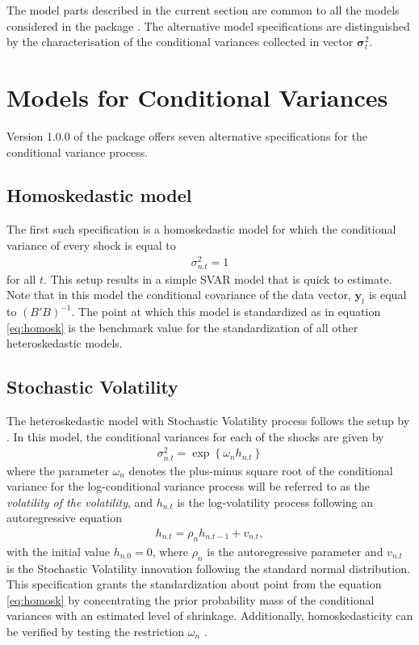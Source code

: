 \documentclass[
  nojss]{jss}
\begin{document}
The model parts described in the current section are common to all the
models considered in the package . The alternative model
specifications are distinguished by the characterisation of the
conditional variances collected in vector \(\boldsymbol{\sigma}_t^2\).

\section{Models for Conditional Variances}\label{sec:variances}

Version 1.0.0 of the  package offers seven alternative
specifications for the conditional variance process.

\subsection{Homoskedastic model}

The first such specification is a homoskedastic model for which the
conditional variance of every shock is equal to \begin{align}
\sigma_{n.t}^2 = 1 \label{eq:homosk}
\end{align} for all \(t\). This setup results in a simple SVAR model
that is quick to estimate. Note that in this model the conditional
covariance of the data vector, \(\mathbf{y}_t\) is equal to
\((B'B)^{-1}\). The point at which this model is standardized as in
equation \eqref{eq:homosk} is the benchmark value for the
standardization of all other heteroskedastic models.

\subsection{Stochastic Volatility}

The heteroskedastic model with Stochastic Volatility process follows the
setup by \cite{LSUW2022}. In this model, the conditional variances for
each of the shocks are given by \begin{align}
\sigma_{n.t}^2 = \exp\left\{\omega_n h_{n.t}\right\}
\end{align} where the parameter \(\omega_n\) denotes the plus-minus
square root of the conditional variance for the log-conditional variance
process will be referred to as the \emph{volatility of the volatility},
and \(h_{n.t}\) is the log-volatility process following an
autoregressive equation \begin{align}
h_{n.t} = \rho_n h_{n.t-1} + v_{n.t},
\end{align} with the initial value \(h_{n.0} = 0\), where \(\rho_n\) is
the autoregressive parameter and \(v_{n.t}\) is the Stochastic
Volatility innovation following the standard normal distribution. This
specification grants the standardization about point from the equation
\eqref{eq:homosk} by concentrating the prior probability mass of the
conditional variances with an estimated level of shrinkage.
Additionally, homoskedasticity can be verified by testing the
restriction \(\omega_n\)
\citep[see][for more details on both points]{LSUW2022}.
\end{document}
